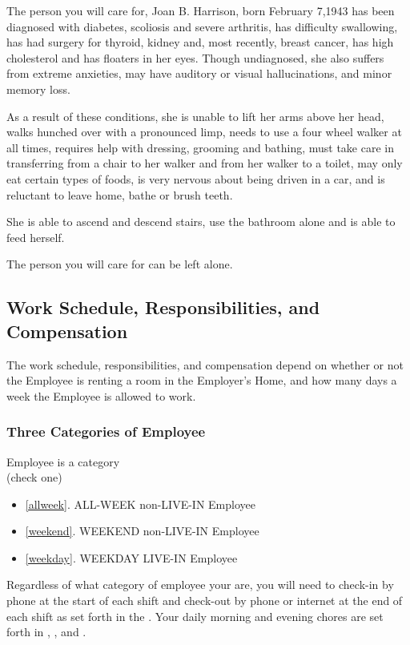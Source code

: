 \documentclass[]{article}
\newcommand{\checkbox}{\raisebox{2pt}{\framebox[12pt][c]{\rule[7pt]{0pt}{-.3\baselineskip}}}}
\newcommand{\mom}{Joan B. Harrison}
\newcommand{\allweek}{ALL-WEEK non-LIVE-IN Employee}
\newcommand{\weekend}{WEEKEND non-LIVE-IN Employee}
\newcommand{\weekday}{WEEKDAY LIVE-IN Employee}
\begin{document}
The person you will care for, \mom{}, born February 7,1943 has been diagnosed with diabetes, scoliosis and severe arthritis, has difficulty swallowing, has had surgery for thyroid, kidney and, most recently, breast cancer, has high cholesterol and has floaters in her eyes. Though undiagnosed, she also suffers from extreme anxieties, may have auditory or visual hallucinations, and minor memory loss.

As a result of these conditions, she is unable to lift her arms above her head, walks hunched over with a pronounced limp, needs to use a four wheel walker at all times, requires help with dressing, grooming and bathing, must take care in transferring from a chair to her walker and from her walker to a toilet, may only eat certain types of foods, is very nervous about being driven in a car, and is reluctant to leave home, bathe or brush teeth.

She is able to ascend and descend stairs, use the bathroom alone and is able to feed herself.

The person you will care for can be left alone.

\subsection*{Work Schedule, Responsibilities, and Compensation}
The work schedule, responsibilities, and compensation depend on whether or not the Employee is renting a room in the Employer's Home, and how many days a week the Employee is allowed to work.
\subsubsection*{Three Categories of Employee}

\noindent Employee is a category\\
\noindent(check one)
\begin{itemize}
	\item[\checkbox] \ref{allweek}. \allweek{}
	\item[\checkbox] \ref{weekend}. \weekend{}
	\item[\checkbox] \ref{weekday}. \weekday{}
\end{itemize}

Regardless of what category of employee your are, you will need to check-in by phone at the start of each shift and check-out by phone or internet at the end of each shift as set forth in the . Your daily morning and evening chores are set forth in \basic{}, \bathroom{}, and \shopping{}. 
\end{document}
